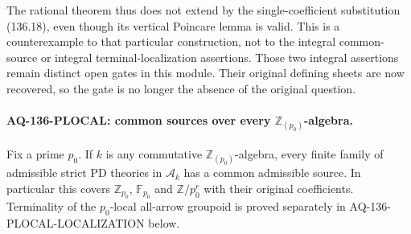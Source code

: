 The rational theorem thus does not extend by the
single-coefficient substitution (136.18), even
though its vertical Poincare lemma is valid.
This is a counterexample to that particular
construction, not to the integral common-source
or integral terminal-localization assertions.
Those two integral assertions remain distinct
open gates in this module.  Their original
defining sheets are now recovered, so the gate
is no longer the absence of the original question.


\paragraph{AQ-136-PLOCAL: common sources over every $\mathbb Z_{(p_0)}$-algebra.}
Fix a prime $p_0$.  If $k$ is any commutative
$\mathbb Z_{(p_0)}$-algebra, every finite family of admissible
strict PD theories in $\mathcal A_k$ has a common admissible
source.  In particular this covers $\mathbb Z_{p_0}$,
$\mathbb F_{p_0}$ and $\mathbb Z/p_0^r$ with their original
coefficients.  Terminality of the $p_0$-local all-arrow groupoid
is proved separately in AQ-136-PLOCAL-LOCALIZATION below.

